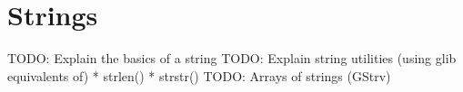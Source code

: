 \chapter{Strings}

TODO: Explain the basics of a string
TODO: Explain string utilities (using glib equivalents of)
 * strlen()
 * strstr()
TODO: Arrays of strings (GStrv)

